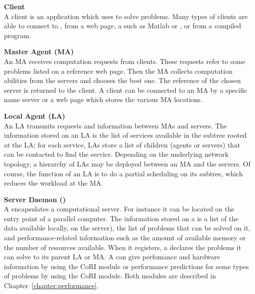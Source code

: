 \begin{description}
\item \textbf{Client}\\ A client is an application which uses \diet to solve
  problems. Many types of clients are able to connect to \diet, from a
  web page, a \pse such as Matlab or \sci, or from a compiled program.
\item \textbf{Master Agent (MA)}\\ An MA receives computation requests from
  clients. These requests refer to some \diet problems listed on a reference
  web page. Then the MA collects computation abilities from the servers and
  chooses the best one. The reference of the chosen server is returned to the
  client. A client can be connected to an MA by a specific name server or a web
  page which stores the various MA locations.

\item \textbf{Local Agent (LA)}\\ An LA transmits requests and information
  between MAs and servers.  The information stored on an LA is the list of
  services available in the subtree rooted at the LA; for each service, LAs
  store a list of children (agents or servers) that can be contacted to find
  the service. Depending on the underlying network topology, a hierarchy of LAs
  may be deployed between an MA and the servers. Of course, the function of an
  LA is to do a partial scheduling on its subtree, which reduces the workload
  at the MA.

\item \textbf{Server Daemon (\sed)}\\ A \sed encapsulates a computational
  server. For instance it can be located on the entry point of a parallel
  computer. The information stored on a \sed is a list of the data available
  locally, \ie on the server), the list of problems that can be solved on it,
  and performance-related information such as the amount of available memory or
  the number of resources available. When it registers, a \sed declares the
  problems it can solve to its parent LA or MA.  A \sed can give perfomance and
  hardware information by using the CoRI module or performance predictions for
  some types of problems by using the CoRI module.  Both modules are described
  in Chapter~\ref{chapter:performance}.

\end{description}

